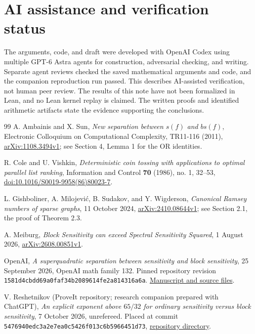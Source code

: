 \documentclass[11pt]{amsart}
\theoremstyle{definition}
\theoremstyle{remark}
\begin{document}
\section*{AI assistance and verification status}
The arguments, code, and draft were developed with OpenAI Codex using
multiple GPT-6 Astra agents for construction, adversarial checking, and
writing. Separate agent reviews checked the saved mathematical arguments
and code, and the companion reproduction run passed. This describes
AI-assisted verification, not human peer review. The results of this note
have not been formalized in Lean, and no Lean kernel replay is claimed.
The written proofs and identified arithmetic artifacts state the evidence
supporting the conclusions.

\begin{thebibliography}{99}
A. Ambainis and X. Sun,
\emph{New separation between $s(f)$ and $bs(f)$},
Electronic Colloquium on Computational Complexity, TR11-116 (2011),
\href{https://arxiv.org/abs/1108.3494v1}{arXiv:1108.3494v1};
see Section 4, Lemma 1 for the OR identities.

R. Cole and U. Vishkin,
\emph{Deterministic coin tossing with applications to optimal parallel
list ranking}, Information and Control \textbf{70} (1986), no. 1, 32--53,
\href{https://doi.org/10.1016/S0019-9958(86)80023-7}{doi:10.1016/S0019-9958(86)80023-7}.

L. Gishboliner, A. Milojevi\'c, B. Sudakov, and Y. Wigderson,
\emph{Canonical Ramsey numbers of sparse graphs}, 11 October 2024,
\href{https://arxiv.org/abs/2410.08644v1}{arXiv:2410.08644v1};
see Section 2.1, the proof of Theorem 2.3.

A. Meiburg,
\emph{Block Sensitivity can exceed Spectral Sensitivity Squared},
1 August 2026,
\href{https://arxiv.org/html/2608.00851v1}{arXiv:2608.00851v1}.

OpenAI,
\emph{A superquadratic separation between sensitivity and block
sensitivity}, 25 September 2026, OpenAI math family 132.
Pinned repository revision
\texttt{1581d4cbdd69a0faf34b2089614fe2a814316a6a}.
\href{https://github.com/openai/math/tree/1581d4cbdd69a0faf34b2089614fe2a814316a6a/preprints/A-superquadratic-separation-between-sensitivity-and-block-sensitivity-September-25-2026}{Manuscript and source files}.

V. Reshetnikov (ProveIt repository; research companion prepared with ChatGPT),
\emph{An explicit exponent above $65/32$ for ordinary sensitivity versus
block sensitivity}, 7 October 2026, unrefereed. Placed at commit
\texttt{5476940edc3a2e7ea0c5426f013c6b5966451d73},
\href{https://github.com/VladimirReshetnikov/ProveIt/tree/5476940edc3a2e7ea0c5426f013c6b5966451d73/Combinatorics/BooleanFunctions/Research/sensitivity-block-sensitivity}{repository directory}.


\end{thebibliography}
\end{document}
